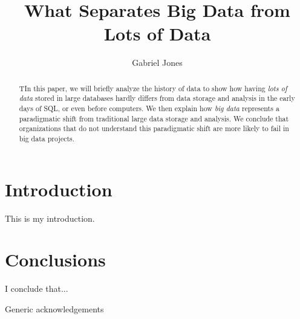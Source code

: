 \documentclass[sigconf]{acmart}
\begin{document}
\title{What Separates Big Data from Lots of Data}


\author{Gabriel Jones}

\renewcommand{\shortauthors}{G. Jones}


\begin{abstract}
TIn this paper, we will briefly analyze the history of data to show how having {\em lots of data} stored in large databases hardly differs from data storage and analysis in the early days of SQL, or even before computers. We then explain how {\em big data} represents a paradigmatic shift from traditional large data storage and analysis. We conclude that organizations that do not understand this paradigmatic shift are more likely to fail in big data projects.
\end{abstract}



\maketitle

\section{Introduction}
This is my introduction.
\cite{Keystone}

\section{Conclusions}
I conclude that...



\begin{acks}

Generic acknowledgements

\end{acks}


 
\end{document}
